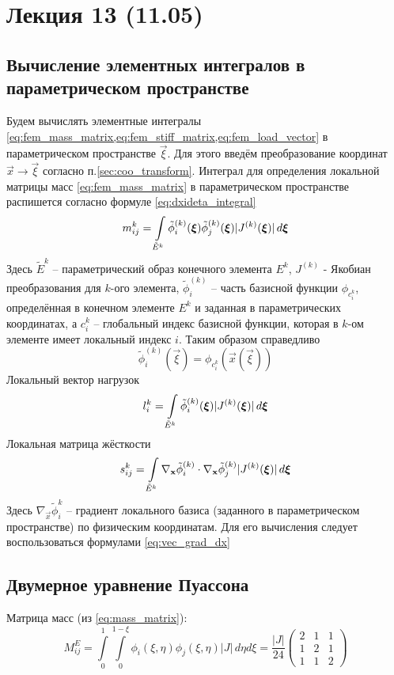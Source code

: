\section{Лекция 13 (11.05)}
\subsection{Вычисление элементных интегралов в параметрическом пространстве}
Будем вычислять элементные интегралы \cref{eq:fem_mass_matrix,eq:fem_stiff_matrix,eq:fem_load_vector}
в параметрическом пространстве $\vec \xi$.
Для этого введём преобразование координат $\vec x \rightarrow \vec \xi$ согласно п.\ref{sec:coo_transform}.
Интеграл для определения локальной матрицы масс \cref{eq:fem_mass_matrix} 
в параметрическом пространстве распишется согласно формуле \cref{eq:dxideta_integral}
\begin{equation}
\label{eq:mass_matrix}
m^k_{ij} = \arint{\tilde \phi^{(k)}_i(\vec \xi) \tilde \phi^{(k)}_j(\vec \xi)|J^{(k)}(\vec \xi)|}{\tilde E^k}{\vec \xi}
\end{equation}
Здесь $\tilde E^k$ -- параметрический образ конечного элемента $E^k$,
$J^{(k)}$ - Якобиан преобразования для $k$-ого элемента,
$\tilde \phi_{i}^{(k)}$ -- часть базисной функции $\phi_{c^k_i}$, определённая
в конечном элементе $E^k$ и заданная в параметрических координатах,
а $c^k_i$ -- глобальный индекс базисной функции, которая в $k$-ом элементе имеет локальный индекс $i$.
Таким образом справедливо
\begin{equation}
\nonumber
\tilde \phi_{i}^{(k)}(\vec \xi) = \phi_{c^k_i}(\vec x(\vec \xi))
\end{equation}
Локальный вектор нагрузок
\begin{equation}
\label{eq:load_vector}
l^k_{i} = \arint{\tilde \phi^{(k)}_i(\vec \xi)|J^{(k)}(\vec \xi)|}{\tilde E^k}{\vec \xi}
\end{equation}
Локальная матрица жёсткости
\begin{equation}
\label{eq:stiff_matrix}
s^k_{ij} = \arint{\nabla_{\vec x} \tilde \phi^{(k)}_i \cdot \nabla_{\vec x} \tilde \phi^{(k)}_j |J^{(k)}(\vec \xi)|}{\tilde E^k}{\vec \xi}
\end{equation}
Здесь $\nabla_{\vec x} \tilde \phi^{k}_i$ -- градиент локального базиса (заданного в параметрическом пространстве) по физическим координатам.
Для его вычисления следует воспользоваться формулами \cref{eq:vec_grad_dx}
\subsection{Двумерное уравнение Пуассона}
Матрица масс (из \cref{eq:mass_matrix}):
\begin{equation}
\label{eq:mass_matrix_lintri}
M^E_{ij} = \int\limits_0^1 \int\limits_0^{1-\xi} \phi_i(\xi, \eta) \phi_j(\xi, \eta) |J| \, d\eta d\xi =
\frac{|J|}{24}\left(
\begin{array}{ccc}
2 & 1 & 1 \\
1 & 2 & 1 \\
1 & 1 & 2
\end{array}
\right)
\end{equation}

